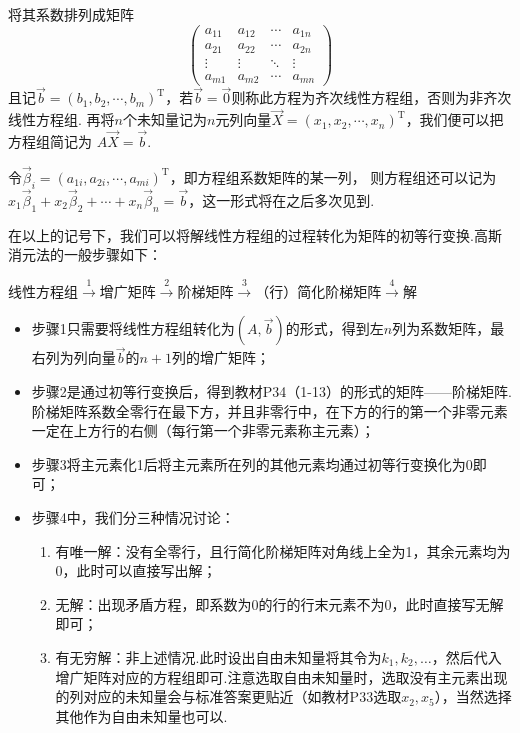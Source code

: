 将其系数排列成矩阵
\[
\begin{pmatrix}
    a_{11} & a_{12} & \cdots & a_{1n} \\
    a_{21} & a_{22} & \cdots & a_{2n} \\
    \vdots & \vdots & \ddots & \vdots \\
    a_{m1} & a_{m2} & \cdots & a_{mn}
\end{pmatrix}
\]
且记$\vec{b}=(b_1,b_2,\cdots,b_m)^\mathrm{T}$，若$\vec{b}=\vec{0}$则称此方程为齐次线性方程组，否则为非齐次线性方程组.
再将$n$个未知量记为$n$元列向量$\vec{X}=(x_1,x_2,\cdots,x_n)^\mathrm{T}$，我们便可以把方程组简记为
$A\vec{X}=\vec{b}$.

令$\vec{\beta}_i=(a_{1i},a_{2i},\cdots,a_{mi})^\mathrm{T}$，即方程组系数矩阵的某一列，
则方程组还可以记为$x_1\vec{\beta}_1+x_2\vec{\beta}_2+\cdots+x_n\vec{\beta}_n=\vec{b}$，这一形式将在之后多次见到.

在以上的记号下，我们可以将解线性方程组的过程转化为矩阵的初等行变换.高斯消元法的一般步骤如下：

\centerline{线性方程组$\overset{1}{\longrightarrow}$增广矩阵$\overset{2}{\longrightarrow}$阶梯矩阵$\overset{3}{\longrightarrow}$（行）简化阶梯矩阵$\overset{4}{\longrightarrow}$解}

\begin{itemize}
    \item 步骤1只需要将线性方程组转化为$(A, \vec{b})$的形式，得到左$n$列为系数矩阵，最右列为列向量$\vec{b}$的$n+1$列的增广矩阵；
    \item 步骤2是通过初等行变换后，得到教材P34（1-13）的形式的矩阵——阶梯矩阵.阶梯矩阵系数全零行在最下方，并且非零行中，在下方的行的第一个非零元素一定在上方行的右侧（每行第一个非零元素称主元素）；
    \item 步骤3将主元素化1后将主元素所在列的其他元素均通过初等行变换化为0即可；
    \item 步骤4中，我们分三种情况讨论：
    \begin{enumerate}
        \item 有唯一解：没有全零行，且行简化阶梯矩阵对角线上全为1，其余元素均为0，此时可以直接写出解；
        \item 无解：出现矛盾方程，即系数为0的行的行末元素不为0，此时直接写无解即可；
        \item 有无穷解：非上述情况.此时设出自由未知量将其令为$k_1,k_2,\ldots$，然后代入增广矩阵对应的方程组即可.注意选取自由未知量时，选取没有主元素出现的列对应的未知量会与标准答案更贴近（如教材P33选取$x_2,x_5$），当然选择其他作为自由未知量也可以.
    \end{enumerate}
\end{itemize}

